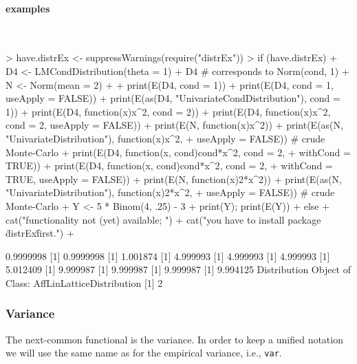 \documentclass[11pt]{article}
\newcommand{\code}[1]{{\tt #1}}
\begin{document}
\paragraph{examples} $ \mbox{ }$\newline
\begin{Schunk}
\begin{Sinput}
> have.distrEx <- suppressWarnings(require("distrEx"))
> if (have.distrEx) 
+     {D4 <- LMCondDistribution(theta = 1)
+      D4  # corresponds to Norm(cond, 1)
+      N <- Norm(mean = 2)
+ 
+      print(E(D4, cond = 1))
+      print(E(D4, cond = 1, useApply = FALSE))
+      print(E(as(D4, "UnivariateCondDistribution"), cond = 1))
+      print(E(D4, function(x){x^2}, cond = 2))
+      print(E(D4, function(x){x^2}, cond = 2, useApply = FALSE))
+      print(E(N, function(x){x^2}))
+      print(E(as(N, "UnivariateDistribution"), function(x){x^2},
+        useApply = FALSE)) # crude Monte-Carlo
+      print(E(D4, function(x, cond){cond*x^2}, cond = 2,
+        withCond = TRUE))
+      print(E(D4, function(x, cond){cond*x^2}, cond = 2,
+        withCond = TRUE, useApply = FALSE))
+      print(E(N, function(x){2*x^2}))
+      print(E(as(N, "UnivariateDistribution"), function(x){2*x^2},
+        useApply = FALSE)) # crude Monte-Carlo
+      Y <- 5 * Binom(4, .25) - 3
+      print(Y); print(E(Y))  
+     } else {
+     cat("\n functionality not (yet) available; ")
+     cat("you have to install package \"distrEx\" first.\n")
+     }
\end{Sinput}
\begin{Soutput}
[1] 0.9999998
[1] 0.9999998
[1] 1.001874
[1] 4.999993
[1] 4.999993
[1] 4.999993
[1] 5.012409
[1] 9.999987
[1] 9.999987
[1] 9.999987
[1] 9.994125
Distribution Object of Class: AffLinLatticeDistribution
[1] 2
\end{Soutput}
\end{Schunk}
%
%
\subsubsection{Variance}
The next-common functional is the variance. In order to keep a unified
notation we will use the same name as for the empirical variance, i.e.,
 \code{var}.
\end{document}
